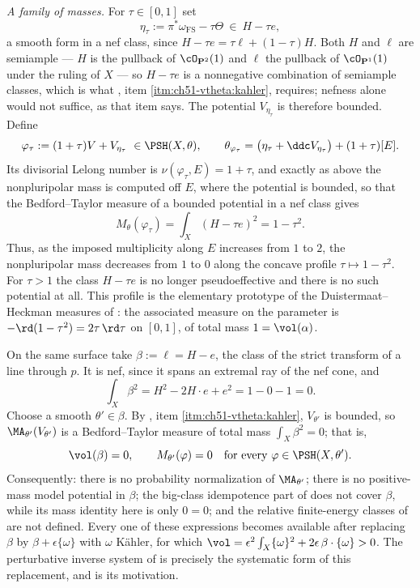 \begin{example}
\emph{A family of masses.}  For $\tau\in[0,1]$ set
\[
 \eta_\tau:=\pi^*\omega_{\mathrm{FS}}-\tau\Theta
 \ \in\ H-\tau e ,
\]
a smooth form in a nef class, since $H-\tau e=\tau\ell+(1-\tau)H$.  Both
$H$ and $\ell$ are semiample --- $H$ is the pullback of
$\cO_{\mathbf P^2}(1)$ and $\ell$ the pullback of
$\cO_{\mathbf P^1}(1)$ under the ruling of $X$ --- so $H-\tau e$ is a
nonnegative combination of semiample classes, which is what
, item \cref{itm:ch51-vtheta:kahler},
requires; nefness alone would not suffice, as that item says.  The potential
$V_{\eta_\tau}$ is therefore bounded.
Define
\[
 \varphi_\tau:=(1+\tau)V+V_{\eta_\tau}\ \in\PSH(X,\theta),
 \qquad
 \theta_{\varphi_\tau}
 =\bigl(\eta_\tau+\ddc V_{\eta_\tau}\bigr)+(1+\tau)[E] .
\]
Its divisorial Lelong number is $\nu(\varphi_\tau,E)=1+\tau$, and
exactly as above the nonpluripolar mass is computed off $E$, where the
potential is bounded, so that the Bedford--Taylor measure of a bounded
potential in a nef class gives
\[
 M_\theta(\varphi_\tau)
 =\int_X(H-\tau e)^2
 =1-\tau^2 .
\]
Thus, as the imposed multiplicity along $E$ increases from $1$ to
$2$, the nonpluripolar mass decreases from $1$ to $0$ along the
concave profile $\tau\mapsto1-\tau^2$.  For $\tau>1$ the class
$H-\tau e$ is no longer pseudoeffective and there is no such potential
at all.  This profile is the elementary prototype of the
Duistermaat--Heckman measures of
: the associated measure on the
parameter is $-\rd(1-\tau^2)=2\tau\,\rd\tau$ on $[0,1]$, of total mass
$1=\vol(\alpha)$.
\end{example}

\begin{example}
\label{ex:ch51-nef-zero-volume}
On the same surface take $\beta:=\ell=H-e$, the class of the strict
transform of a line through $p$.  It is nef, since it spans an extremal
ray of the nef cone, and
\[
 \int_X\beta^2=H^2-2H\cdot e+e^2=1-0-1=0 .
\]
Choose a smooth $\theta'\in\beta$.  By
, item \cref{itm:ch51-vtheta:kahler},
$V_{\theta'}$ is bounded, so $\MA_{\theta'}(V_{\theta'})$ is a
Bedford--Taylor measure of total mass $\int_X\beta^2=0$; that is,
\[
 \vol(\beta)=0,
 \qquad
 M_{\theta'}(\varphi)=0
 \quad\text{for every }\varphi\in\PSH(X,\theta').
\]
Consequently: there is no probability normalization of
$\MA_{\theta'}$; there is no positive-mass model potential in
$\beta$; the big-class idempotence part of
 does not cover $\beta$, while its mass
identity here is only $0=0$; and the relative finite-energy classes of
 are not defined.  Every one of these
expressions becomes available after replacing $\beta$ by
$\beta+\epsilon\{\omega\}$ with $\omega$ K\"ahler, for which
$\vol=\epsilon^2\int_X\{\omega\}^2+2\epsilon\,\beta\cdot\{\omega\}>0$.
The perturbative inverse system of
 is precisely the systematic form of
this replacement, and  is its motivation.
\end{example}

